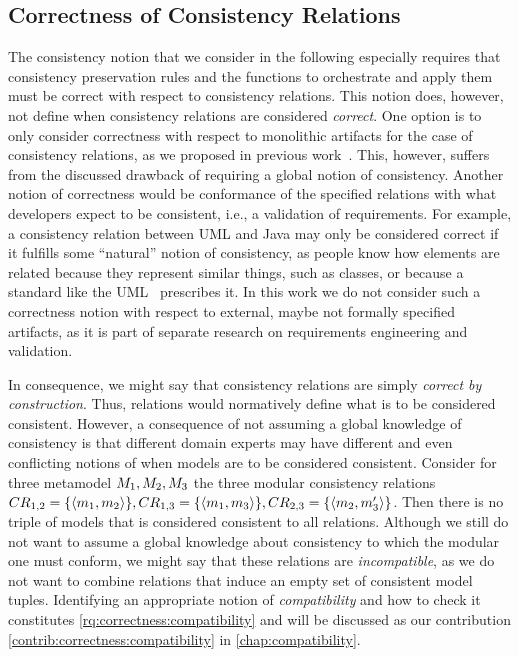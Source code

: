 \subsection{Correctness of Consistency Relations}
\label{chap:correctness:notions_correctness:relations}

The consistency notion that we consider in the following especially requires that consistency preservation rules and the functions to orchestrate and apply them must be correct with respect to consistency relations.
This notion does, however, not define when consistency relations are considered \emph{correct}.
One option is to only consider correctness with respect to monolithic artifacts for the case of consistency relations, as we proposed in previous work~.
This, however, suffers from the discussed drawback of requiring a global notion of consistency.
Another notion of correctness would be conformance of the specified relations with what developers expect to be consistent, i.e., a validation of requirements.
For example, a consistency relation between \gls{UML} and Java may only be considered correct if it fulfills some \enquote{natural} notion of consistency, as people know how elements are related because they represent similar things, such as classes, or because a standard like the \gls{UML}~\cite{uml} prescribes it.
In this work we do not consider such a correctness notion with respect to external, maybe not formally specified artifacts, as it is part of separate research on requirements engineering and validation.

In consequence, we might say that consistency relations are simply \emph{correct by construction}.
Thus, relations would normatively define what is to be considered consistent.
However, a consequence of not assuming a global knowledge of consistency is that different domain experts may have different and even conflicting notions of when models are to be considered consistent.
Consider for three metamodel $\metamodel{M}{1}, \metamodel{M}{2}, \metamodel{M}{3}$ the three modular consistency relations $\consistencyrelation{CR}{1,2} = \setted{\tupled{\model{m}{1},\model{m}{2}}}, \consistencyrelation{CR}{1,3} = \setted{\tupled{\model{m}{1},\model{m}{3}}}, \consistencyrelation{CR}{2,3} = \setted{\tupled{\model{m}{2},\model{m}{3}'}}$. 
Then there is no triple of models that is considered consistent to all relations. 
Although we still do not want to assume a global knowledge about consistency to which the modular one must conform, we might say that these relations are \emph{incompatible}, as we do not want to combine relations that induce an empty set of consistent model tuples.
Identifying an appropriate notion of \emph{compatibility} and how to check it constitutes \autoref{rq:correctness:compatibility} and will be discussed as our contribution \autoref{contrib:correctness:compatibility} in \autoref{chap:compatibility}.


